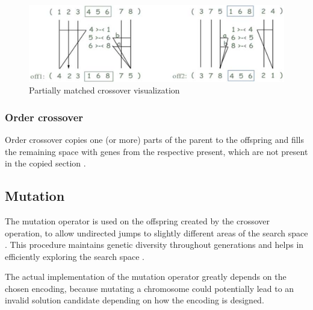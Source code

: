 \documentclass[sigconf]{acmart}
\begin{document}
\begin{figure}[h]
  \includegraphics[scale=0.14]{assets/partially-matched-crossover.png}
  \caption{Partially matched crossover visualization \cite{Katoch2021}}
\end{figure}


\subsubsection{Order crossover}
Order crossover copies one (or more) parts of the parent to the offspring
and fills the remaining space with genes from the respective present, which
are not present in the copied section \cite{Katoch2021}.



\subsection{Mutation}
The mutation operator is used on the offspring created by the crossover
operation, to allow undirected jumps to slightly different areas of the search
space \cite{Affenzeller2009}. This procedure maintains genetic diversity
throughout generations and helps in efficiently exploring the search space
\cite{Katoch2021, Affenzeller2009}.

The actual implementation of the mutation operator greatly depends on the chosen
encoding, because mutating a chromosome could potentially lead to an invalid
solution candidate depending on how the encoding is designed.
\end{document}
